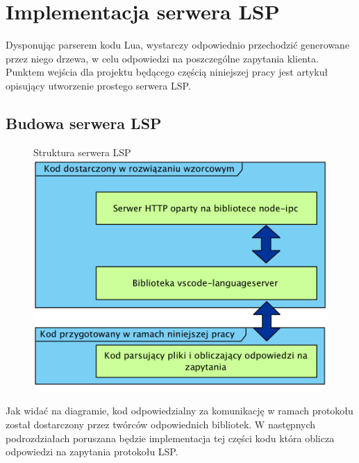 \chapter{Implementacja serwera LSP}
Dysponując parserem kodu Lua, wystarczy odpowiednio przechodzić generowane przez niego drzewa, w celu odpowiedzi na poszczególne zapytania klienta. Punktem wejścia dla projektu będącego częścią niniejszej pracy jest artykuł \cite{lsp_sample} opisujący utworzenie prostego serwera LSP.

\section{Budowa serwera LSP}
\begin{figure}[H]
\centering
Struktura serwera LSP\\
\includegraphics[scale=0.5]{Chapters/struktura_serwera}
\end{figure}

Jak widać na diagramie, kod odpowiedzialny za komunikację w ramach protokołu został dostarczony przez twórców odpowiednich bibliotek. W następnych podrozdziałach poruszana będzie implementacja tej części kodu która oblicza odpowiedzi na zapytania protokołu LSP.

